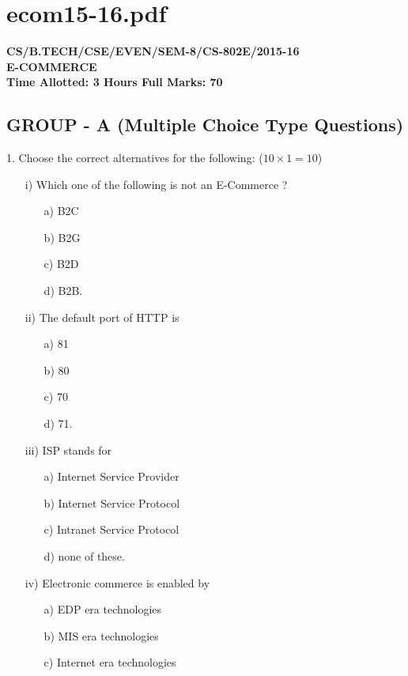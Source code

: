 \documentclass{article}
\begin{document}
\newpage
\section*{ecom15-16.pdf}
\textbf{CS/B.TECH/CSE/EVEN/SEM-8/CS-802E/2015-16} \\
\textbf{E-COMMERCE} \\
\textbf{Time Allotted: 3 Hours \hfill Full Marks: 70}

\subsection*{GROUP - A (Multiple Choice Type Questions)}
1. Choose the correct alternatives for the following: ($10 \times 1 = 10$)
\begin{enumerate}
    \item[i)] Which one of the following is not an E-Commerce ?
    \begin{enumerate}
        \item[a)] B2C
        \item[b)] B2G
        \item[c)] B2D
        \item[d)] B2B.
    \end{enumerate}
    \item[ii)] The default port of HTTP is
    \begin{enumerate}
        \item[a)] 81
        \item[b)] 80
        \item[c)] 70
        \item[d)] 71.
    \end{enumerate}
    \item[iii)] ISP stands for
    \begin{enumerate}
        \item[a)] Internet Service Provider
        \item[b)] Internet Service Protocol
        \item[c)] Intranet Service Protocol
        \item[d)] none of these.
    \end{enumerate}
    \item[iv)] Electronic commerce is enabled by
    \begin{enumerate}
        \item[a)] EDP era technologies
        \item[b)] MIS era technologies
        \item[c)] Internet era technologies

\end{enumerate}
\end{enumerate}
\end{document}
